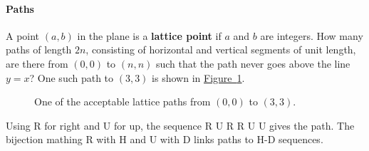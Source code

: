 \documentclass[10pt,]{book}
\newcommand{\terminology}[1]{\textbf{#1}}
\theoremstyle{plain}
\theoremstyle{definition}
\theoremstyle{definition}
\numberwithin{equation}{chapter}
\begin{document}
\paragraph[{Paths}]{Paths}\hypertarget{paragraphs-3}{}
\hypertarget{p-60}{}%
A point \((a, b)\) in the plane is a \terminology{lattice point} if \(a\) and \(b\) are integers. How many paths of length \(2n\), consisting of horizontal and vertical segments of unit length, are there from \((0, 0)\) to \((n, n)\) such that the path never goes above the line \(y = x\)? One such path to \((3, 3)\) is shown in \hyperref[catalanpathex]{Figure~\ref{catalanpathex}}.%
\begin{figure}
\centering
{
}
\caption{One of the acceptable lattice paths from \((0,0)\) to \((3,3)\).\label{catalanpathex}}
\end{figure}
\hypertarget{p-61}{}%
Using R for right and U for up, the sequence R U R R U U gives the path. The bijection mathing R with H and U with D links paths to H-D sequences.%
\typeout{************************************************}
\typeout{************************************************}
\end{document}
